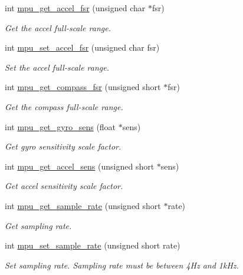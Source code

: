 \begin{DoxyCompactItemize}
int \hyperlink{group___d_r_i_v_e_r_s_gab6087a15ee23db23b6aec41590329a60}{mpu\+\_\+get\+\_\+accel\+\_\+fsr} (unsigned char $\ast$fsr)
\begin{DoxyCompactList}\small\item\em Get the accel full-\/scale range. \end{DoxyCompactList}\item 
int \hyperlink{group___d_r_i_v_e_r_s_ga2713a96af104cfb2ae8e0ed4c3718119}{mpu\+\_\+set\+\_\+accel\+\_\+fsr} (unsigned char fsr)
\begin{DoxyCompactList}\small\item\em Set the accel full-\/scale range. \end{DoxyCompactList}\item 
int \hyperlink{group___d_r_i_v_e_r_s_gade8589573d09e0f14b84130428f286df}{mpu\+\_\+get\+\_\+compass\+\_\+fsr} (unsigned short $\ast$fsr)
\begin{DoxyCompactList}\small\item\em Get the compass full-\/scale range. \end{DoxyCompactList}\item 
int \hyperlink{group___d_r_i_v_e_r_s_ga023c0cc94aa8f162dc33b15048a49421}{mpu\+\_\+get\+\_\+gyro\+\_\+sens} (float $\ast$sens)
\begin{DoxyCompactList}\small\item\em Get gyro sensitivity scale factor. \end{DoxyCompactList}\item 
int \hyperlink{group___d_r_i_v_e_r_s_ga620408949052b96e856cad920f856583}{mpu\+\_\+get\+\_\+accel\+\_\+sens} (unsigned short $\ast$sens)
\begin{DoxyCompactList}\small\item\em Get accel sensitivity scale factor. \end{DoxyCompactList}\item 
int \hyperlink{group___d_r_i_v_e_r_s_ga2487dd551b701c1c7ed4d6335f02b2f1}{mpu\+\_\+get\+\_\+sample\+\_\+rate} (unsigned short $\ast$rate)
\begin{DoxyCompactList}\small\item\em Get sampling rate. \end{DoxyCompactList}\item 
int \hyperlink{group___d_r_i_v_e_r_s_ga0144d666a67a82888b8580002afe8b55}{mpu\+\_\+set\+\_\+sample\+\_\+rate} (unsigned short rate)
\begin{DoxyCompactList}\small\item\em Set sampling rate. Sampling rate must be between 4\+Hz and 1k\+Hz. \end{DoxyCompactList}\item 

\end{DoxyCompactItemize}
